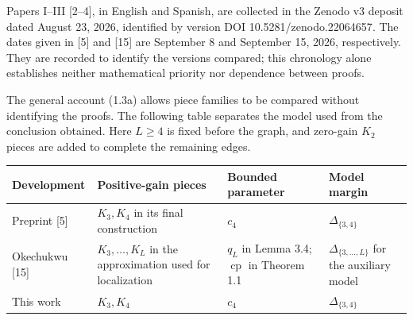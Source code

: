 \documentclass[english,11pt,a4paper]{article}
\newcounter{none}
\begin{document}
Papers I--III {[}2--4{]}, in English and Spanish, are collected in the Zenodo v3 deposit dated August 23, 2026, identified by version DOI {\ttfamily\small 10.\discretionary{\hbox{\ensuremath{\hookrightarrow}}}{}{}5281/\discretionary{\hbox{\ensuremath{\hookrightarrow}}}{}{}zenodo.\discretionary{\hbox{\ensuremath{\hookrightarrow}}}{}{}22064657}. The dates given in {[}5{]} and {[}15{]} are September 8 and September 15, 2026, respectively. They are recorded to identify the versions compared; this chronology alone establishes neither mathematical priority nor dependence between proofs.

The general account (1.3a) allows piece families to be compared without identifying the proofs. The following table separates the model used from the conclusion obtained. Here \(L\ge4\) is fixed before the graph, and zero-gain \(K_2\) pieces are added to complete the remaining edges.


{\def\LTcaptype{none} %
\begin{longtable}[c]{@{}
  >{\raggedright\arraybackslash}p{}
  >{\raggedright\arraybackslash}p{}
  >{\raggedright\arraybackslash}p{}
  >{\raggedright\arraybackslash}p{}@{}}
\toprule\noalign{}
\begin{minipage}[b]{\linewidth}\raggedright
Development
\end{minipage} & \begin{minipage}[b]{\linewidth}\raggedright
Positive-gain pieces
\end{minipage} & \begin{minipage}[b]{\linewidth}\raggedright
Bounded parameter
\end{minipage} & \begin{minipage}[b]{\linewidth}\raggedright
Model margin
\end{minipage} \\
\midrule\noalign{}
\endhead
\bottomrule\noalign{}
\endlastfoot
Preprint {[}5{]} & \(K_3,K_4\) in its final construction & \(c_4\) & \(\Delta_{\{3,4\}}\) \\
Okechukwu {[}15{]} & \(K_3,\ldots,K_L\) in the approximation used for localization & \(q_L\) in Lemma 3.4; \(\operatorname{cp}\) in Theorem 1.1 & \(\Delta_{\{3,\ldots,L\}}\) for the auxiliary model \\
This work & \(K_3,K_4\) & \(c_4\) & \(\Delta_{\{3,4\}}\) \\
\end{longtable}
}
\end{document}
